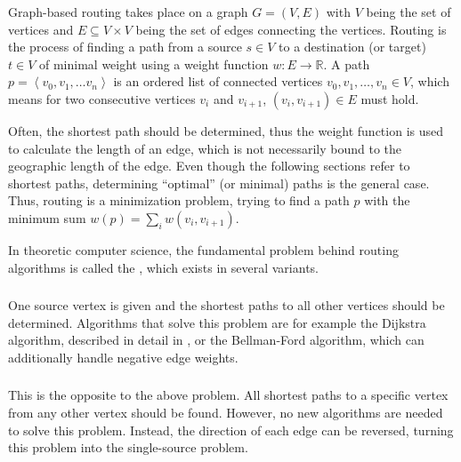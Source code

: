 		Graph-based routing takes place on a graph $G=(V, E)$ with $V$ being the set of vertices and $E \subseteq V \times V$ being the set of edges connecting the vertices.
		Routing is the process of finding a path from a source $s \in V$ to a destination (or target) $t \in V$ of minimal weight using a weight function $w: E \rightarrow \mathbb{R}$.
		A path $p=\left\langle v_0, v_1, \dots v_n \right\rangle$ is an ordered list of connected vertices $v_0, v_1, \dots, v_n \in V$, which means for two consecutive vertices $v_i$ and $v_{i+1}$, $(v_i, v_{i+1}) \in E$ must hold.
		
		Often, the shortest path should be determined, thus the weight function is used to calculate the length of an edge, which is not necessarily bound to the geographic length of the edge.
		Even though the following sections refer to shortest paths, determining \enquote{optimal} (or minimal) paths is the general case.
		Thus, routing is a minimization problem, trying to find a path $p$ with the minimum sum $w(p) = \sum_i{w(v_i, v_{i+1})}$\cite[645]{cormen-introduction-to-alg}.
		
		In theoretic computer science, the fundamental problem behind routing algorithms is called the , which exists in several variants\cite[644]{cormen-introduction-to-alg}.
		
		\subsubsection{}
		\label{subsubsec:single-source-shortest-path}
		
			One source vertex is given and the shortest paths to all other vertices should be determined.
			Algorithms that solve this problem are for example the Dijkstra algorithm, described in detail in , or the Bellman-Ford algorithm, which can additionally handle negative edge weights\cite[651]{cormen-introduction-to-alg}.
		
		\subsubsection{}
		
			This is the opposite to the above problem.
			All shortest paths to a specific vertex from any other vertex should be found.
			However, no new algorithms are needed to solve this problem.
			Instead, the direction of each edge can be reversed, turning this problem into the single-source problem.
		
